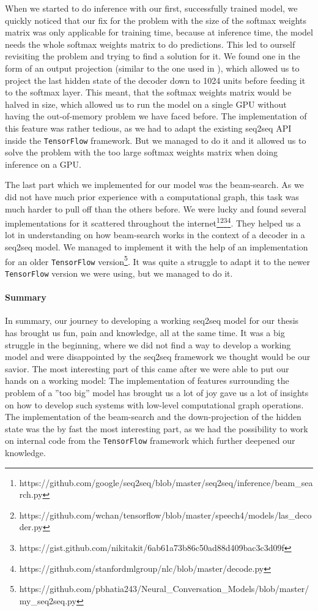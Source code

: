 When we started to do inference with our first, successfully trained model, we quickly noticed that our fix for the problem with the size of the softmax weights matrix was only applicable for training time, because at inference time, the model needs the whole softmax weights matrix to do predictions. This led to ourself revisiting the problem and trying to find a solution for it. We found one in the form of an output projection (similar to the one used in \cite{Vinyals:2015}), which allowed us to project the last hidden state of the decoder down to 1024 units before feeding it to the softmax layer. This meant, that the softmax weights matrix would be halved in size, which allowed us to run the model on a single GPU without having the out-of-memory problem we have faced before. The implementation of this feature was rather tedious, as we had to adapt the existing seq2seq API inside the \texttt{TensorFlow} framework. But we managed to do it and it allowed us to solve the problem with the too large softmax weights matrix when doing inference on a GPU.

The last part which we implemented for our model was the beam-search. As we did not have much prior experience with a computational graph, this task was much harder to pull off than the others before. We were lucky and found several implementations for it scattered throughout the internet\footnote{https://github.com/google/seq2seq/blob/master/seq2seq/inference/beam\_search.py}\footnote{https://github.com/wchan/tensorflow/blob/master/speech4/models/las\_decoder.py}\footnote{https://gist.github.com/nikitakit/6ab61a73b86c50ad88d409bac3c3d09f}\footnote{https://github.com/stanfordmlgroup/nlc/blob/master/decode.py}. They helped us a lot in understanding on how beam-search works in the context of a decoder in a seq2seq model. We managed to implement it with the help of an implementation for an older \texttt{TensorFlow} version\footnote{https://github.com/pbhatia243/Neural\_Conversation\_Models/blob/master/my\_seq2seq.py}. It was quite a struggle to adapt it to the newer \texttt{TensorFlow} version we were using, but we managed to do it.

\paragraph{Summary} In summary, our journey to developing a working seq2seq model for our thesis has brought us fun, pain and knowledge, all at the same time. It was a big struggle in the beginning, where we did not find a way to develop a working model and were disappointed by the seq2seq framework we thought would be our savior. The most interesting part of this came after we were able to put our hands on a working model: The implementation of features surrounding the problem of a ''too big'' model has brought us a lot of joy gave us a lot of insights on how to develop such systems with low-level computational graph operations. The implementation of the beam-search and the down-projection of the hidden state was the by fast the most interesting part, as we had the possibility to work on internal code from the \texttt{TensorFlow} framework which further deepened our knowledge.

